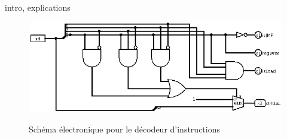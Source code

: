 \paragraph{}{
	intro, explications
}

\begin{figure}
	\centering
	\includegraphics[scale=0.6,origin=c]{circuits/deco_instru.png}
	\label{decod_inst_circ}
	\caption{Sch\'{e}ma \'{e}lectronique pour le d\'{e}codeur d'instructions}
\end{figure}